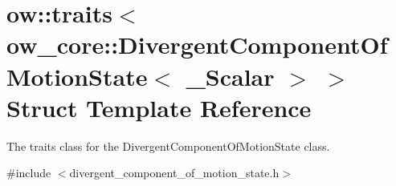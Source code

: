 \hypertarget{structow_1_1traits_3_01ow__core_1_1DivergentComponentOfMotionState_3_01__Scalar_01_4_01_4}{}\section{ow\+:\+:traits$<$ ow\+\_\+core\+:\+:Divergent\+Component\+Of\+Motion\+State$<$ \+\_\+\+Scalar $>$ $>$ Struct Template Reference}
\label{structow_1_1traits_3_01ow__core_1_1DivergentComponentOfMotionState_3_01__Scalar_01_4_01_4}


The traits class for the Divergent\+Component\+Of\+Motion\+State class.  




{\ttfamily \#include $<$divergent\+\_\+component\+\_\+of\+\_\+motion\+\_\+state.\+h$>$}

